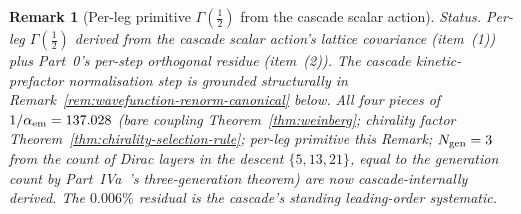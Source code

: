 \documentclass[12pt,a4paper]{article}
\newtheorem*{remark}{Remark}
\begin{document}
\begin{remark}[Per-leg primitive $\Gamma(\tfrac{1}{2})$ from the cascade scalar action]
\medskip\noindent\emph{Status.} Per-leg $\Gamma(\tfrac{1}{2})$ derived from the cascade scalar action's lattice covariance (item~(1)) plus Part~0's per-step orthogonal residue (item~(2)). The cascade kinetic-prefactor normalisation step is grounded structurally in Remark~\ref{rem:wavefunction-renorm-canonical} below. All four pieces of $1/\alpha_{\rm em} = 137.028$ (bare coupling Theorem~\ref{thm:weinberg}; chirality factor Theorem~\ref{thm:chirality-selection-rule}; per-leg primitive this Remark; $N_{\rm gen}=3$ from the count of Dirac layers in the descent $\{5,13,21\}$, equal to the generation count by Part~IVa~\cite{part4a}'s three-generation theorem) are now cascade-internally derived. The $0.006\%$ residual is the cascade's standing leading-order systematic.
\end{remark}
\end{document}
